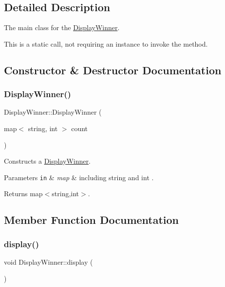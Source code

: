 \subsection{Detailed Description}
The main class for the \hyperlink{classDisplayWinner}{Display\+Winner}. 

This is a static call, not requiring an instance to invoke the method. 

\subsection{Constructor \& Destructor Documentation}
\mbox{\label{classDisplayWinner_a88bd9a2c36dba7809acbc030ca628379}} 
\subsubsection{\texorpdfstring{Display\+Winner()}{DisplayWinner()}}
{\footnotesize\ttfamily Display\+Winner\+::\+Display\+Winner (\begin{DoxyParamCaption}\item[{map$<$ string, int $>$}]{count }\end{DoxyParamCaption})}



Constructs a \hyperlink{classDisplayWinner}{Display\+Winner}. 


\begin{DoxyParams}[1]{Parameters}
\mbox{\tt in}  & {\em map} & including string and int .\\
\hline
\end{DoxyParams}
\begin{DoxyReturn}{Returns}
map$<$string,int$>$. 
\end{DoxyReturn}


\subsection{Member Function Documentation}
\mbox{\label{classDisplayWinner_a20410b9011f23f62f8c6aa3b6fc830f3}} 
\subsubsection{\texorpdfstring{display()}{display()}}
{\footnotesize\ttfamily void Display\+Winner\+::display (\begin{DoxyParamCaption}{ }\end{DoxyParamCaption})}



